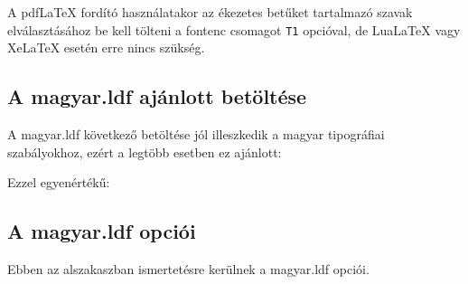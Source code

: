 \documentclass[12pt]{article}
\begin{document}
A pdf\LaTeX{} fordító használatakor az ékezetes betűket
tartalmazó szavak elválasztásához be kell tölteni a \textsf{fontenc} csomagot \texttt{T1} opcióval, de Lua\LaTeX{} vagy Xe\LaTeX{} esetén erre nincs szükség.

\subsection{A \textsf{magyar.ldf} ajánlott betöltése}

A \textsf{magyar.ldf} következő betöltése jól illeszkedik a magyar tipográfiai szabályokhoz, ezért a legtöbb esetben ez ajánlott:

\begin{latexcode}
\usepackage[T1]{fontenc} %
\usepackage[magyar]{babel}
\end{latexcode}
Ezzel egyenértékű:

\begin{latexcode}
\usepackage[T1]{fontenc} %
\usepackage[hungarian]{babel}
\end{latexcode}

\subsection{A \textsf{magyar.ldf} opciói}

Ebben az alszakaszban ismertetésre kerülnek a \textsf{magyar.ldf} opciói.
\end{document}
